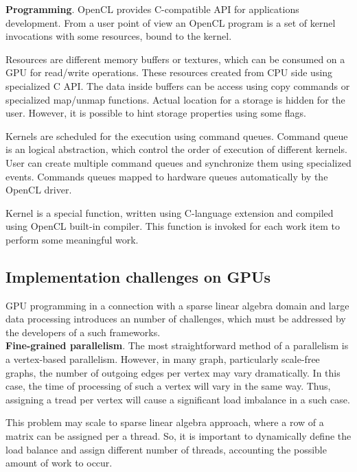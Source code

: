 \textbf{Programming}. OpenCL provides C-compatible API for applications development. From a user point of view an OpenCL program is a set of kernel invocations with some resources, bound to the kernel. 

Resources are different memory buffers or textures, which can be consumed on a GPU for read/write operations. These resources created from CPU side using specialized C API. The data inside buffers can be access using copy commands or specialized map/unmap functions. Actual location for a storage is hidden for the user. However, it is possible to hint storage properties using some flags.

Kernels are scheduled for the execution using command queues. Command queue is an logical abstraction, which control the order of execution of different kernels. User can create multiple command queues and synchronize them using specialized events. Commands queues mapped to hardware queues automatically by the OpenCL driver.

Kernel is a special function, written using C-language extension and compiled using OpenCL built-in compiler. This function is invoked for each work item to perform some meaningful work.\\

\subsection{Implementation challenges on GPUs}

GPU programming in a connection with a sparse linear algebra domain and large data processing introduces an number of challenges, which must be addressed by the developers of a such frameworks.\\

\textbf{Fine-grained parallelism}. The most straightforward method of a parallelism is a vertex-based parallelism. However, in many graph, particularly scale-free graphs, the number of outgoing edges per vertex may vary dramatically. In this case, the time of processing of such a vertex will vary in the same way. Thus, assigning a tread per vertex will cause a significant load imbalance in a such case. 

This problem may scale to sparse linear algebra approach, where a row of a matrix can be assigned per a thread. So, it is important to dynamically define the load balance and assign different number of threads, accounting the possible amount of work to occur.\\

